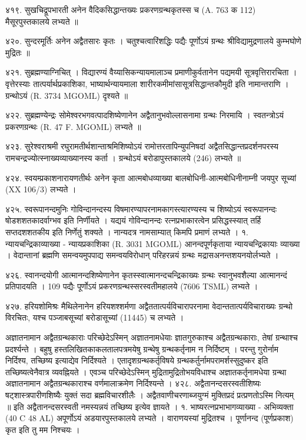 ४१९. सुखचिद्रूपभारती
अनेन वैदिकसिद्धान्तख्यः प्रकरणग्रन्थकृतस्स च (A. 763 क 112) मैसूरपुस्तकालये लभ्यते ॥

४२०. सुन्दरमूर्तिः 
अनेन अद्वैतसारः कृतः । चतुश्चत्वारिंशद्धिः पद्यैः पूर्णोऽयं ग्रन्थः श्रीविद्यामुद्रणालये कुम्भघोणे मुद्रितः ॥

४२१. सुब्रह्मण्याग्निचित् ।
विद्यारण्यं वैय्यासिकन्यायमालाञ्च प्रमाणीकुर्वतानेन पद्यमयी सूत्रवृत्तिरारचिता । वृत्तेरस्याः तात्पर्यार्थप्रकाशिका, भाष्यार्थन्यायमाला शारीरकमीमांसासूत्रसिद्धान्तकौमुदी इति नामान्तराणि । ग्रन्थोऽयं (R. 3734 MGOML) दृश्यते ॥

४२२. सुब्रह्मण्येन्द्रः
सोमेश्वरभगवत्पादशिष्येणानेन अद्वैतानुभवोल्लासनामा ग्रन्थः निरमायि । स्वतन्त्रोऽयं प्रकरणग्रन्थः (R. 47 F. MGOML) लभ्यते ॥

४२३. सुरेश्वराश्रमी
रघुरामतीर्थशान्ताश्रमिशिष्योऽयं रामोत्तरतापिन्युपनिषदां अद्वैतसिद्धान्तप्रदर्शनपरस्य रामचन्द्रज्योत्स्नाख्यव्याख्यानस्य कर्ता । ग्रन्थोऽयं बरोडापुस्तकालये (246) लभ्यते ॥

४२४. स्वयम्प्रकाशनारायणतीर्थः
अनेन कृता आत्मबोधव्याख्या बालबोधिनी-आत्मबोधिनीनाम्नी जयपुर सूच्यां (XX 106/3) लभ्यते ।

४२५. स्वरूपानन्दमुनिः
गोविन्दानन्दस्य विषमारण्यापरनामकागस्त्यारण्यस्य च शिष्योऽयं स्वरूपानन्दः षोडशशतकादर्वाग्भव इति निर्णीयते । यद्ययं गोविन्दानन्दः रत्नप्रभाकारत्वेन प्रसिद्धस्स्यात् तर्हि सप्तदशशतकीय इति निर्णेतुं शक्यते । नान्यदत्र नामसाम्यात् किमपि प्रमाणं लभ्यते ।
१. न्यायचन्द्रिकाव्याख्या - न्यायप्रकाशिका (R. 3031 MGOML)
आनन्दपूर्णकृताया न्यायचन्द्रिकायाः व्याख्या । वेदान्तानां ब्रह्मणि समन्वयमुपपाद्य समन्वयविरोधान् परिहरन्नयं ग्रन्थः मद्रासअनन्तशयनयोर्लभ्यते ।

४२६. स्वानन्दयोगी
आत्मानन्दशिष्येणानेन कृतस्स्वात्मानन्दचन्द्रिकाख्यः ग्रन्थः स्वानुभवशैल्या आत्मानन्दं प्रतिपादयति । 109 पद्यैः पूर्णोऽयं प्रकरणग्रन्थस्सरस्वतीमहालये (7606 TSML) लभ्यते ।

४२७. हरियशोमिश्रः
मैथिलेनानेन हरियशश्शर्मणा अद्वैततात्पर्यविचारापरनामा वेदान्ततात्पर्यविचाराख्यः ग्रन्थो विरचितः, यश्च पञ्जाबसूच्यां बरोडासूच्यां (11445) च लभ्यते ।

अज्ञातनामान अद्वैतग्रन्थकाराः
परिच्छेदेऽस्मिन् अज्ञातनामधेयाः ज्ञातगुरुकाश्च अद्वैतग्रन्थकाराः, तेषां ग्रन्थाश्च प्रदर्श्यन्ते । बहुषु हस्तलिखितकाकलतालपत्रमयेषु ग्रन्थेषु ग्रन्थकर्तृनाम न निर्दिष्टम् । परन्तु गुरोर्नाम निर्दिश्य, तच्छिष्य इत्याद्येव निर्दिश्यते । एतादृशग्रन्थकर्तृविषये ग्रन्थकर्तुर्नामपरामर्शस्सुदुष्कर इति तच्छिष्यत्वेनैवात्र व्यवह्नियते । एवञ्च परिच्छेदेऽस्मिन् मुद्रितामुद्रितोभयविधाश्च अज्ञातकर्तृनामधेया ग्रन्था अज्ञातनामान अद्वैतग्रन्थकाराश्च वर्णमालाक्रमेण निर्दिश्यन्ते ।
४२८. अद्वैतानन्दसरस्वतीशिष्यः
षट्शास्त्रपारीणशिष्यैः युक्तं सदा ब्रह्मविचारशीलैः । अद्वैतवाणीचरणाब्जयुग्मं मुक्तिप्रदं प्रत्प्रणतोऽस्मि नित्यम् ॥ इति अद्वैतानन्दसरस्वती नमस्यन्नयं तच्छिष्य इत्येव ज्ञायते ।
१. भाष्यरत्नप्रभाभागव्याख्या - अभिव्यक्ता (40 C 48 AL) अपूर्णोऽयं अडयारपुस्तकालये लभ्यते । वाराणयस्यां मुद्रितश्च । पूर्णानन्द (पूर्णप्रकाश) कृत इति तु मम निश्चयः ।

